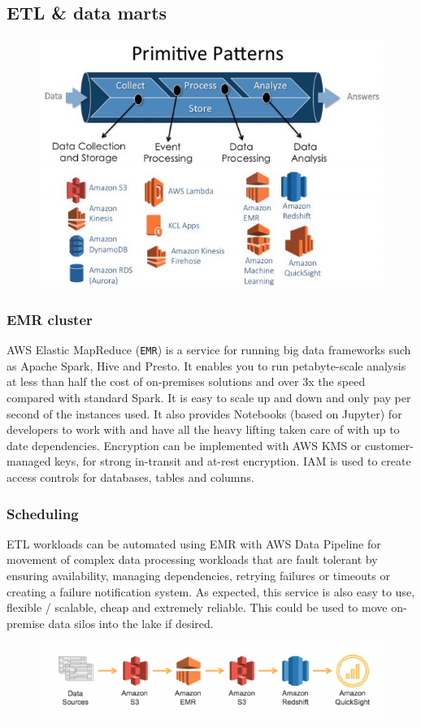 \documentclass[10pt]{article}
\begin{document}
\newpage
\subsection{ETL \& data marts}
\begin{figure}[h!]
	\centering
	\includegraphics[width=0.8\linewidth]{images/AWSAnalyticsPipeline.png}
	\cite{aws-warehousing}
\end{figure}
\subsubsection{EMR cluster}
AWS Elastic MapReduce (\texttt{EMR}) is a service for running big data frameworks such as Apache Spark, Hive and Presto. It enables you to run petabyte-scale analysis at less than half the cost of on-premises solutions and over 3x the speed compared with standard Spark. It is easy to scale up and down and only pay per second of the instances used. It also provides Notebooks (based on Jupyter) for developers to work with and have all the heavy lifting taken care of with up to date dependencies. Encryption can be implemented with AWS KMS or customer-managed keys, for strong in-transit and at-rest encryption. IAM is used to create access controls for databases, tables and columns. \cite{aws-emr}
\subsubsection{Scheduling}
ETL workloads can be automated using EMR with AWS Data Pipeline for movement of complex data processing workloads that are fault tolerant by ensuring availability, managing dependencies, retrying failures or timeouts or creating a failure notification system. As expected, this service is also easy to use, flexible / scalable, cheap and extremely reliable. This could be used to move on-premise data silos into the lake if desired.
\begin{figure}[h!]
	\centering
	\includegraphics[width=0.8\linewidth]{images/AWSWorkflow.png}
	\cite{aws-warehousing}
\end{figure}
\end{document}
